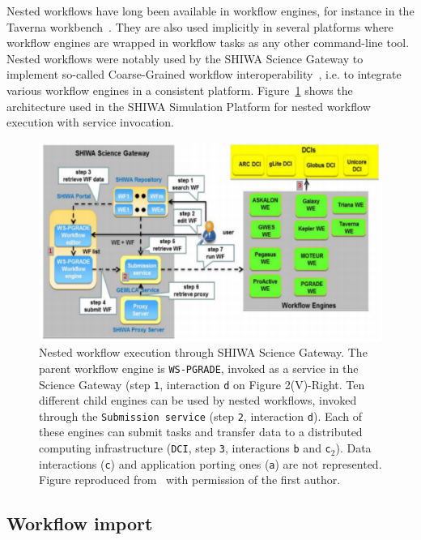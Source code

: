 \documentclass[preprint,3p,twocolumn]{elsarticle}
\begin{document}
Nested workflows have long been available in workflow engines, for
instance in the Taverna workbench~\cite{oinn2004taverna}. They are
also used implicitly in several platforms where workflow engines are
wrapped in workflow tasks as any other command-line tool. Nested
workflows were notably used by the SHIWA Science Gateway to implement
so-called Coarse-Grained workflow
interoperability~\cite{terstyanszky2014enabling}, i.e. to integrate
various workflow engines in a consistent
platform. Figure~\ref{fig:shiwa-architecture} shows the architecture
used in the SHIWA Simulation Platform for nested workflow execution
with service invocation.
\begin{figure}
\centering
\includegraphics[width=1.5\columnwidth]{figures/shiwa-science-gateway.pdf}
\caption{Nested workflow execution through SHIWA Science Gateway. The
  parent workflow engine is \texttt{WS-PGRADE}, invoked as a service
  in the Science Gateway (step \texttt{1}, interaction \texttt{d} on
  Figure 2(V)-Right. Ten different child engines can be used by nested
  workflows, invoked through the \texttt{Submission service} (step
  \texttt{2}, interaction \texttt{d}). Each of these engines can
  submit tasks and transfer data to a distributed computing
  infrastructure (\texttt{DCI}, step \texttt{3}, interactions
  \texttt{b} and \texttt{c$_2$}). Data interactions (\texttt{c}) and
  application porting ones (\texttt{a}) are not represented. Figure
  reproduced from~\cite{terstyanszky2014enabling} with permission of
  the first author.}
\label{fig:shiwa-architecture}
\end{figure}

\subsection{Workflow import}
\end{document}

